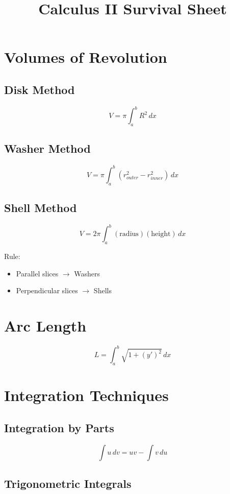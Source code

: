 \documentclass[11pt]{article}
\title{Calculus II Survival Sheet}
\author{}
\date{}
\theoremstyle{mydef}
\begin{document}
\maketitle

\section*{Volumes of Revolution}

\subsection*{Disk Method}
\[
V=\pi\int_a^b R^2\,dx
\]

\subsection*{Washer Method}
\[
V=\pi\int_a^b (r_{outer}^2-r_{inner}^2)\,dx
\]

\subsection*{Shell Method}
\[
V=2\pi\int_a^b (\text{radius})(\text{height})\,dx
\]

Rule:
\begin{itemize}
\item Parallel slices $\rightarrow$ Washers
\item Perpendicular slices $\rightarrow$ Shells
\end{itemize}

\section*{Arc Length}

\[
L=\int_a^b \sqrt{1+(y')^2}\,dx
\]


\section*{Integration Techniques}

\subsection*{Integration by Parts}
\[
\int u\,dv=uv-\int v\,du
\]

\subsection*{Trigonometric Integrals}
\end{document}
